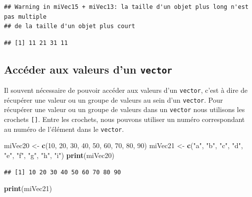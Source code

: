 \documentclass[
]{book}
\newenvironment{Shaded}{\begin{snugshade}}{\end{snugshade}}
\newcommand{\DecValTok}[1]{\textcolor[rgb]{0.00,0.00,0.81}{#1}}
\newcommand{\KeywordTok}[1]{\textcolor[rgb]{0.13,0.29,0.53}{\textbf{#1}}}
\newcommand{\NormalTok}[1]{#1}
\newcommand{\StringTok}[1]{\textcolor[rgb]{0.31,0.60,0.02}{#1}}
\begin{document}
\begin{verbatim}
## Warning in miVec15 + miVec13: la taille d'un objet plus long n'est pas multiple
## de la taille d'un objet plus court
\end{verbatim}

\begin{verbatim}
## [1] 11 21 31 11
\end{verbatim}

\hypertarget{accuxe9der-aux-valeurs-dun-vector}{%
\subsection{\texorpdfstring{Accéder aux valeurs d'un \texttt{vector}}{Accéder aux valeurs d'un vector}}\label{accuxe9der-aux-valeurs-dun-vector}}

Il souvent nécessaire de pouvoir accéder aux valeurs d'un \texttt{vector}, c'est à dire de récupérer une valeur ou un groupe de valeurs au sein d'un \texttt{vector}. Pour récupérer une valeur ou un groupe de valeurs dans un \texttt{vector} nous utilisons les crochets \texttt{{[}{]}}. Entre les crochets, nous pouvons utiliser un numéro correspondant au numéro de l'élément dans le \texttt{vector}.

\begin{Shaded}
\begin{Highlighting}[]
\NormalTok{miVec20 <-}\StringTok{ }\KeywordTok{c}\NormalTok{(}\DecValTok{10}\NormalTok{, }\DecValTok{20}\NormalTok{, }\DecValTok{30}\NormalTok{, }\DecValTok{40}\NormalTok{, }\DecValTok{50}\NormalTok{, }\DecValTok{60}\NormalTok{, }\DecValTok{70}\NormalTok{, }\DecValTok{80}\NormalTok{, }\DecValTok{90}\NormalTok{)}
\NormalTok{miVec21 <-}\StringTok{ }\KeywordTok{c}\NormalTok{(}\StringTok{"a"}\NormalTok{, }\StringTok{"b"}\NormalTok{, }\StringTok{"c"}\NormalTok{, }\StringTok{"d"}\NormalTok{, }\StringTok{"e"}\NormalTok{, }\StringTok{"f"}\NormalTok{, }\StringTok{"g"}\NormalTok{, }\StringTok{"h"}\NormalTok{, }\StringTok{"i"}\NormalTok{)}
\KeywordTok{print}\NormalTok{(miVec20)}
\end{Highlighting}
\end{Shaded}

\begin{verbatim}
## [1] 10 20 30 40 50 60 70 80 90
\end{verbatim}

\begin{Shaded}
\begin{Highlighting}[]
\KeywordTok{print}\NormalTok{(miVec21)}
\end{Highlighting}
\end{Shaded}
\end{document}
